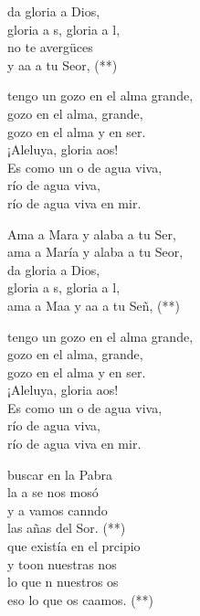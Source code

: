 \documentclass[12pt]{article}
\begin{document}
\begin{multicols*}{2}
\begin{cancion}
da gloria a Dios,\\
	gloria a s, gloria a l,\\
	no te avergüces  \\
	y aa a tu Seor, (**)\\
	\begin{chorus}%
	 tengo un gozo en el alma grande,\\
gozo en el alma, grande,\\
	gozo en el alma y en ser.\\
	¡Aleluya, gloria aos!\\
	Es como un o de agua viva, \\
río de agua viva,\\
	río de agua viva en mir. \\
	\end{chorus}%
	Ama a Mara y alaba a tu Ser,\\
	ama a María y alaba a tu Seor,\\
da gloria a Dios,\\
	gloria a s, gloria a l,\\
	ama a Maa y aa a tu Señ, (**)  \\
	\begin{chorus}%
	 tengo un gozo en el alma grande,\\
gozo en el alma, grande,\\
	gozo en el alma y en ser.\\
	¡Aleluya, gloria aos!\\
	Es como un o de agua viva, \\
río de agua viva,\\
	río de agua viva en mir. \\
	\end{chorus}%
\end{cancion}%

\begin{cancion}%
	 buscar en la Pabra\\
	la a se nos mosó\\
	y a  vamos canndo \\
	las añas del Sor. (**) \\
	 que existía en el prcipio \\
	y toon nuestras nos\\
	lo que n nuestros os \\
	eso lo que os caamos. (**)\\
\end{cancion}%


\end{multicols*}
\end{document}
